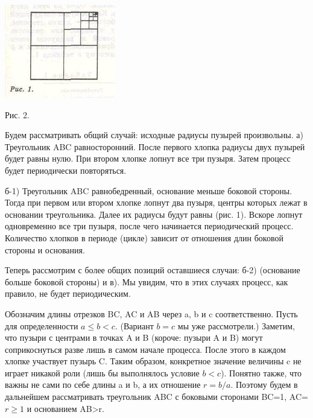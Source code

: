 \begin{enumerate}
\begin{minipage}[t]{0.35\linewidth}
        \begin{minipage}[c]{\textwidth}
        \centering
            \includegraphics[width=\linewidth]{pic2.png}
            \caption{Рис. 2.}
            \label{fig:pic2}
        \end{minipage}
    \end{minipage}

    \hspace{0.05\textwidth}

    \begin{minipage}[t]{0.6\linewidth}
        Будем рассматривать общий случай: исходные радиусы пузырей произвольны.
        а) Треугольник ABC равносторонний. После первого хлопка радиусы двух пузырей будет равны нулю. При втором хлопке лопнут все три пузыря. Затем процесс будет периодически повторяться.

        б-1) Треугольник ABC равнобедренный, основание меньше боковой стороны. Тогда при первом или втором хлопке лопнут два пузыря, центры которых лежат в основании треугольника. Далее их радиусы будут равны (рис. 1). Вскоре лопнут одновременно все три пузыря, после чего начинается периодический процесс. Количество хлопков в периоде (цикле) зависит от отношения длин боковой стороны и основания.

        Теперь рассмотрим с более общих позиций оставшиеся случаи: б-2) (основание больше боковой стороны) и в). Мы увидим, что в этих случаях процесс, как правило, не будет периодическим.

        Обозначим длины отрезков BC, AC и AB через a, b и c соответственно. Пусть для определенности $a \leqslant b < c$. (Вариант $b=c$ мы уже рассмотрели.) Заметим, что пузыри с центрами в точках A и B (короче: пузыри A и B) могут соприкоснуться разве лишь в самом начале процесса. После этого в каждом хлопке участвует пузырь C. Таким образом, конкретное значение величины c не играет никакой роли (лишь бы выполнялось условие $b<c$). Понятно также, что важны не сами по себе длины a и b, а их отношение $r=b/a$. Поэтому будем в дальнейшем рассматривать треугольник ABC с боковыми сторонами BC=1, AC=$r \geq 1$ и основанием AB>r.


\end{minipage}
\end{enumerate}
